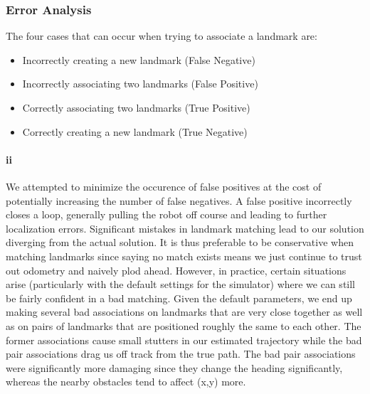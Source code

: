 \documentclass[12pt]{article}
\begin{document}
\subsubsection*{Error Analysis}

The four cases that can occur when trying to associate a landmark are:
\begin{itemize}
\item Incorrectly creating a new landmark (False Negative)
\item Incorrectly associating two landmarks (False Positive)
\item Correctly associating two landmarks (True Positive)
\item Correctly creating a new landmark (True Negative)
\end{itemize}

\paragraph{ii}
We attempted to minimize the occurence of false positives at the cost of potentially increasing the number of false negatives.
A false positive incorrectly closes a loop, generally pulling the robot off course and leading to further localization errors.
Significant mistakes in landmark matching lead to our solution diverging from the actual solution. It is thus preferable to be
conservative when matching landmarks since saying no match exists means we just continue to trust out odometry and naively
plod ahead. However, in practice, certain situations arise (particularly with the default settings for the simulator) where
we can still be fairly confident in a bad matching. Given the default parameters, we end up making several bad associations on
landmarks that are very close together as well as on pairs of landmarks that are positioned roughly the same to each other.
The former associations cause small stutters in our estimated trajectory while the bad pair associations drag us off track
from the true path. The bad pair associations were significantly more damaging since they change the heading significantly,
whereas the nearby obstacles tend to affect (x,y) more.
\end{document}
